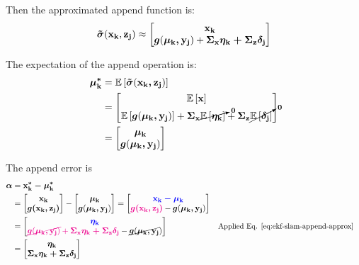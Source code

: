 \documentclass[12pt]{article}
\begin{document}
Then the approximated append function is:
\begin{equation}
    {\boldsymbol{\tilde{\sigma}}}(\boldsymbol{\mathbf{x_k}}, \boldsymbol{\mathbf{z_j}}) \approx \begin{bmatrix}
       \boldsymbol{\mathbf{x_k}} \\
       {\boldsymbol{g}}(\boldsymbol{\mathbf{\mu_k, y_j}}) + \boldsymbol{\mathbf{\Sigma_x \eta_k + \Sigma_z \delta_j}}
    \end{bmatrix}
\label{eq:ekf-slam-append-approx}
\end{equation}

The expectation of the append operation is:
\begin{equation}
\begin{aligned}
    \boldsymbol{\mathbf{\mu_k^*}} &= \mathbb{E}\left[\boldsymbol{\mathbf{\tilde{\sigma}}}(\boldsymbol{\mathbf{x_k, z_j}})\right]\\
    &= \begin{bmatrix}
        \mathbb{E}\left[\boldsymbol{\mathbf{x}}\right] \\
        \mathbb{E}\left[{\boldsymbol{g}}(\boldsymbol{\mathbf{\mu_k, y_j}})\right] + \boldsymbol{\mathbf{\Sigma_x}} 
        \cancelto{\boldsymbol{\mathbf{0}}}{\mathbb{E}\left[\boldsymbol{\mathbf{\eta_k}}\right]} + \boldsymbol{\mathbf{\Sigma_z}} 
        \cancelto{\boldsymbol{\mathbf{0}}}{\mathbb{E}\left[\boldsymbol{\mathbf{\delta_j}}\right]}
    \end{bmatrix}\\
    &= \begin{bmatrix}
        \boldsymbol{\mathbf{\mu_k}} \\
        {\boldsymbol{g}}(\boldsymbol{\mathbf{\mu_k, y_j}})
    \end{bmatrix}
\end{aligned}
\end{equation}

The append error is 
\begin{equation}
\begin{aligned}
   \boldsymbol{\mathbf{\alpha}} &= \boldsymbol{\mathbf{x_k^* - \mu_k^*}}\\
   &= \begin{bmatrix}
       \boldsymbol{\mathbf{x_k}} \\ {\boldsymbol{g(\boldsymbol{\mathbf{x_k, z_j}})}}
   \end{bmatrix} - \begin{bmatrix}
       \boldsymbol{\mathbf{\mu_k}} \\ {\boldsymbol{g}}(\boldsymbol{\mathbf{\mu_k, y_j}})
   \end{bmatrix} = \begin{bmatrix}
       \color{blue}\boldsymbol{\mathbf{x_k - \mu_k}}\color{black}\\
       \color{magenta}{\boldsymbol{g(\boldsymbol{\mathbf{x_k, z_j}})}}\color{black} - {\boldsymbol{g}}(\boldsymbol{\mathbf{\mu_k, y_j}})
   \end{bmatrix}\\
   &= \begin{bmatrix}
       \color{blue}\boldsymbol{\mathbf{\eta_k}}\color{black} \\
       \color{magenta}\cancel{{\boldsymbol{g}}(\boldsymbol{\mathbf{\mu_k, y_j}})} + 
       \boldsymbol{\mathbf{\Sigma_x \eta_k + \Sigma_z \delta_j}}\color{black} 
       - \cancel{{\boldsymbol{g}}(\boldsymbol{\mathbf{\mu_k, y_j}}})
   \end{bmatrix} && \small\text{Applied Eq. 
   \ref{eq:ekf-slam-append-approx}}\\
    &= \begin{bmatrix}
       \boldsymbol{\mathbf{\eta_k}} \\
       \boldsymbol{\mathbf{\Sigma_x \eta_k + \Sigma_z \delta_j}}
   \end{bmatrix}
\end{aligned}
\end{equation}
\end{document}
